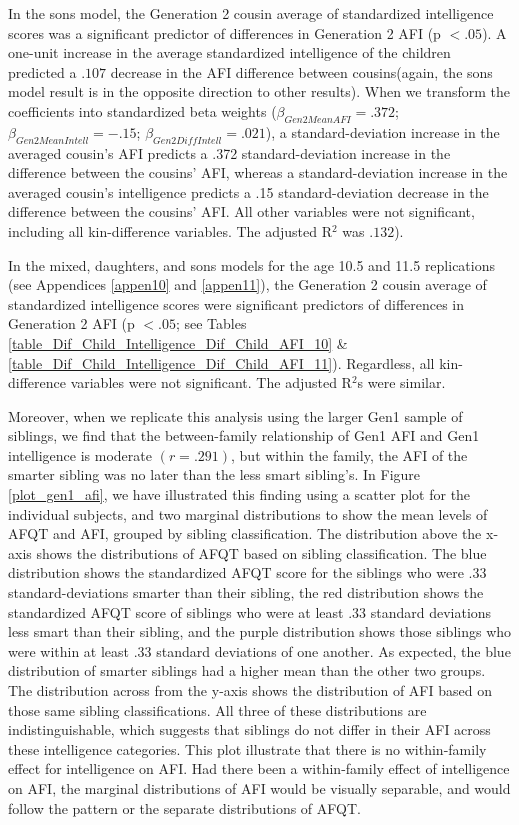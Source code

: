 In the sons model, the Generation 2 cousin average of standardized intelligence scores was a significant predictor of differences in Generation 2 AFI (p $< .05$). A one-unit increase in the average standardized intelligence of the children predicted a $.107$ decrease in the AFI difference between cousins(again, the sons model result is in the opposite direction to other results). When we transform the coefficients into standardized beta weights ($\beta_{Gen2 Mean AFI} = .372$; $\beta_{Gen2 Mean Intell} = -.15$; $\beta_{Gen2 Diff Intell} = .021$), a standard-deviation increase in the averaged cousin's AFI predicts a .372 standard-deviation increase in the difference between the cousins' AFI, whereas a standard-deviation increase in the averaged cousin's intelligence predicts a .15 standard-deviation decrease in the difference between the cousins' AFI. All other variables were not significant, including all kin-difference variables. The adjusted R$^{2}$ was $.132$). 

In the mixed, daughters, and sons models for the age 10.5 and 11.5 replications (see Appendices \ref{appen10} and \ref{appen11}), the Generation 2 cousin average of standardized intelligence scores were significant predictors of differences in Generation 2 AFI (p $< .05$; see Tables \ref{table_Dif_Child_Intelligence_Dif_Child_AFI_10} \& \ref{table_Dif_Child_Intelligence_Dif_Child_AFI_11}). Regardless, all kin-difference variables were not significant. The adjusted R$^{2}$s were similar. 

Moreover, when we replicate this analysis using the larger Gen1 sample of siblings, we find that the between-family relationship of Gen1 AFI and Gen1 intelligence is moderate $(r =.291)$, but within the family, the AFI of the smarter sibling was no later than the less smart sibling's. In Figure \ref{plot_gen1_afi}, we have illustrated this finding using a scatter plot for the individual subjects, and two marginal distributions to show the mean levels of AFQT and AFI, grouped by sibling classification. The distribution above the x-axis shows the distributions of AFQT based on sibling classification. The blue distribution shows the standardized AFQT score for the siblings who were .33 standard-deviations smarter than their sibling, the red distribution shows the standardized AFQT score of siblings who were at least .33 standard deviations less smart than their sibling, and the purple distribution shows those siblings who were within at least .33 standard deviations of one another. As expected, the blue distribution of smarter siblings had a higher mean than the other two groups. The distribution across from the y-axis shows the distribution of AFI based on those same sibling classifications. All three of these distributions are indistinguishable, which suggests that siblings do not differ in their AFI across these intelligence categories. This plot illustrate that there is no within-family effect for intelligence on AFI. Had there been a within-family effect of intelligence on AFI, the marginal distributions of AFI would be visually separable, and would follow the pattern or the separate distributions of AFQT.%

